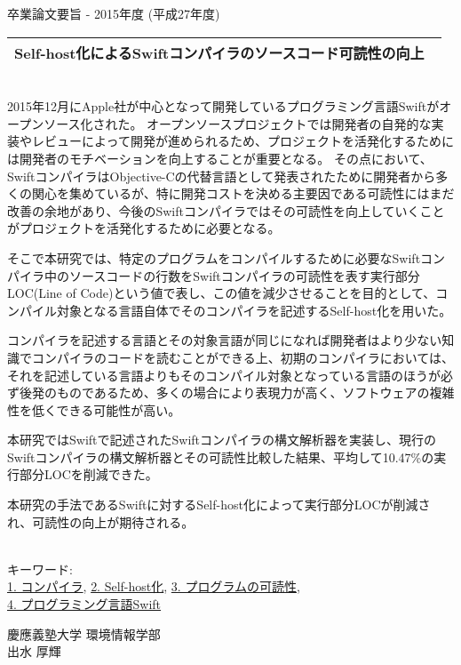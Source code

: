 卒業論文要旨 - 2015年度 (平成27年度)
\begin{center}
\begin{large}
\begin{tabular}{|M{0.97\linewidth}|}
    \hline
    Self-host化によるSwiftコンパイラのソースコード可読性の向上\\
    \hline
\end{tabular}
\end{large}
\end{center}

~ \\

2015年12月にApple社が中心となって開発しているプログラミング言語Swiftがオープンソース化された。
オープンソースプロジェクトでは開発者の自発的な実装やレビューによって開発が進められるため、プロジェクトを活発化するためには開発者のモチベーションを向上することが重要となる。
その点において、SwiftコンパイラはObjective-Cの代替言語として発表されたために開発者から多くの関心を集めているが、特に開発コストを決める主要因である可読性にはまだ改善の余地があり、今後のSwiftコンパイラではその可読性を向上していくことがプロジェクトを活発化するために必要となる。

そこで本研究では、特定のプログラムをコンパイルするために必要なSwiftコンパイラ中のソースコードの行数をSwiftコンパイラの可読性を表す実行部分LOC(Line of Code)という値で表し、この値を減少させることを目的として、コンパイル対象となる言語自体でそのコンパイラを記述するSelf-host化を用いた。

コンパイラを記述する言語とその対象言語が同じになれば開発者はより少ない知識でコンパイラのコードを読むことができる上、初期のコンパイラにおいては、それを記述している言語よりもそのコンパイル対象となっている言語のほうが必ず後発のものであるため、多くの場合により表現力が高く、ソフトウェアの複雑性を低くできる可能性が高い。

本研究ではSwiftで記述されたSwiftコンパイラの構文解析器を実装し、現行のSwiftコンパイラの構文解析器とその可読性比較した結果、平均して10.47\%の実行部分LOCを削減できた。

本研究の手法であるSwiftに対するSelf-host化によって実行部分LOCが削減され、可読性の向上が期待される。

~ \\
キーワード:\\
\underline{1. コンパイラ},
\underline{2. Self-host化},
\underline{3. プログラムの可読性},\\
\underline{4. プログラミング言語Swift}
\begin{flushright}
慶應義塾大学 環境情報学部\\
出水 厚輝
\end{flushright}

